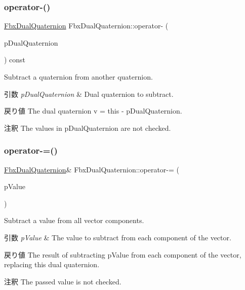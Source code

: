 \subsubsection{\texorpdfstring{operator-\/()}{operator-()}\hspace{0.1cm}{\footnotesize\ttfamily [3/3]}}
{\footnotesize\ttfamily \hyperlink{class_fbx_dual_quaternion}{Fbx\+Dual\+Quaternion} Fbx\+Dual\+Quaternion\+::operator-\/ (\begin{DoxyParamCaption}\item[{const \hyperlink{class_fbx_dual_quaternion}{Fbx\+Dual\+Quaternion} \&}]{p\+Dual\+Quaternion }\end{DoxyParamCaption}) const}

Subtract a quaternion from another quaternion. 
\begin{DoxyParams}{引数}
{\em p\+Dual\+Quaternion} & Dual quaternion to subtract. \\
\hline
\end{DoxyParams}
\begin{DoxyReturn}{戻り値}
The dual quaternion v\textquotesingle{} = this -\/ p\+Dual\+Quaternion. 
\end{DoxyReturn}
\begin{DoxyRemark}{注釈}
The values in p\+Dual\+Quaternion are not checked. 
\end{DoxyRemark}
\mbox{\label{class_fbx_dual_quaternion_a7f4a57f4e63ea5eaa809e5af5e083828}} 
\subsubsection{\texorpdfstring{operator-\/=()}{operator-=()}\hspace{0.1cm}{\footnotesize\ttfamily [1/2]}}
{\footnotesize\ttfamily \hyperlink{class_fbx_dual_quaternion}{Fbx\+Dual\+Quaternion}\& Fbx\+Dual\+Quaternion\+::operator-\/= (\begin{DoxyParamCaption}\item[{double}]{p\+Value }\end{DoxyParamCaption})}

Subtract a value from all vector components. 
\begin{DoxyParams}{引数}
{\em p\+Value} & The value to subtract from each component of the vector. \\
\hline
\end{DoxyParams}
\begin{DoxyReturn}{戻り値}
The result of subtracting p\+Value from each component of the vector, replacing this dual quaternion. 
\end{DoxyReturn}
\begin{DoxyRemark}{注釈}
The passed value is not checked. 
\end{DoxyRemark}
\mbox{\label{class_fbx_dual_quaternion_a51b0a1b4483267962470cb607754f508}} 
